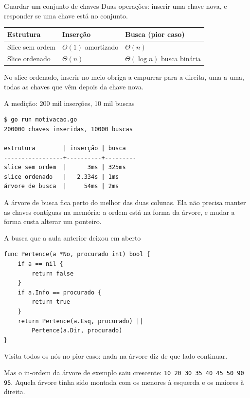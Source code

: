 \documentclass{beamer}
\begin{document}
\begin{frame}{Guardar um conjunto de chaves}
  Duas operações: inserir uma chave nova, e responder se uma chave está no
  conjunto.

  \vspace{0.5cm}
  \begin{center}
    \begin{tabular}{lll}
      \toprule
      \textbf{Estrutura} & \textbf{Inserção} & \textbf{Busca (pior caso)} \\
      \midrule
      Slice sem ordem & $O(1)$ amortizado & $\Theta(n)$ \\
      Slice ordenado  & $\Theta(n)$ & $\Theta(\log n)$ busca binária \\
      \bottomrule
    \end{tabular}
  \end{center}

  \vspace{0.5cm}
  No slice ordenado, inserir no meio obriga a empurrar para a direita, uma a
  uma, todas as chaves que vêm depois da chave nova.
\end{frame}

\begin{frame}[fragile]{A medição: 200 mil inserções, 10 mil buscas}
\begin{verbatim}
$ go run motivacao.go
200000 chaves inseridas, 10000 buscas

estrutura        | inserção | busca
-----------------+----------+---------
slice sem ordem  |      3ms | 325ms
slice ordenado   |   2.334s | 1ms
árvore de busca  |     54ms | 2ms
\end{verbatim}

  \vspace{0.2cm}
  A árvore de busca fica perto do melhor das duas colunas. Ela não precisa
  manter as chaves contíguas na memória: a ordem está na forma da árvore, e
  mudar a forma custa alterar um ponteiro.
\end{frame}

\begin{frame}[fragile]{A busca que a aula anterior deixou em aberto}
\begin{verbatim}
func Pertence(a *No, procurado int) bool {
	if a == nil {
		return false
	}
	if a.Info == procurado {
		return true
	}
	return Pertence(a.Esq, procurado) ||
		Pertence(a.Dir, procurado)
}
\end{verbatim}

  \vspace{0.2cm}
  Visita todos os nós no pior caso: nada na árvore diz de que lado continuar.

  \vspace{0.2cm}
  Mas o in-ordem da árvore de exemplo saiu crescente:
  \texttt{10 20 30 35 40 45 50 90 95}. Aquela árvore tinha sido montada com os
  menores à esquerda e os maiores à direita.
\end{frame}
\end{document}
